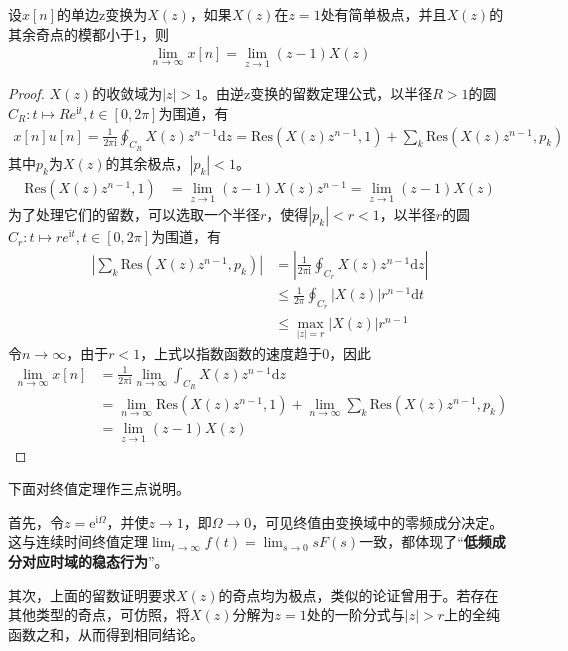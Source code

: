 \begin{theorem}[单边z变换的终值定理]
    设$x[n]$的单边z变换为$X(z)$，如果$X(z)$在$z=1$处有简单极点，并且$X(z)$的其余奇点的模都小于1，则\begin{align*}
    \lim_{n\to\infty}x[n]=\lim_{z\to 1}(z-1)X(z)
    \end{align*}
\end{theorem}
\begin{proof}
    $X(z)$的收敛域为$|z|>1$。由逆z变换的留数定理公式，以半径$R>1$的圆$C_R:t\mapsto Re^{\mathrm{i}t},t\in[0,2\pi]$为围道，有\begin{align*}
    x[n]u[n]=\frac{1}{2\pi\mathrm{i}}\oint_{C_R}X(z)z^{n-1}\mathrm{d}z=\mathrm{Res}(X(z)z^{n-1},1)+\sum_{k}\mathrm{Res}(X(z)z^{n-1},p_k)
    \end{align*}
    其中$p_k$为$X(z)$的其余极点，$|p_k|<1$。
    \begin{align*}
        \mathrm{Res}(X(z)z^{n-1},1)&=\lim_{z\to 1}(z-1)X(z)z^{n-1}=\lim_{z\to 1}(z-1)X(z)
    \end{align*}
    为了处理它们的留数，可以选取一个半径$r$，使得$|p_k|<r<1$，以半径$r$的圆$C_{r}:t\mapsto re^{\mathrm{i}t},t\in[0,2\pi]$为围道，有\begin{align*}
    \left|\sum_{k}\mathrm{Res}(X(z)z^{n-1},p_k)\right|&=\left|\frac{1}{2\pi\mathrm{i}}\oint_{C_r}X(z)z^{n-1}\mathrm{d}z\right|\\
    &\leq \frac{1}{2\pi}\oint_{C_r}|X(z)|r^{n-1}\mathrm{d}t\\
    &\leq \max_{|z|=r}|X(z)|r^{n-1}
    \end{align*}
    令$n\to\infty$，由于$r<1$，上式以指数函数的速度趋于$0$，因此\begin{align*}
    \lim_{n\to\infty}x[n]&=\frac{1}{2\pi\mathrm{i}}\lim_{n\to\infty}\int_{C_R}X(z)z^{n-1}\mathrm{d}z\\
    &=\lim_{n\to\infty}\mathrm{Res}(X(z)z^{n-1},1)+\lim_{n\to\infty}\sum_{k}\mathrm{Res}(X(z)z^{n-1},p_k)\\
    &=\lim_{z\to 1}(z-1)X(z)
    \end{align*}
\end{proof}

下面对终值定理作三点说明。

首先，令$z=\mathrm{e}^{\mathrm{i}\Omega}$，并使$z\to 1$，即$\Omega\to 0$，可见终值由变换域中的零频成分决定。这与连续时间终值定理$\lim_{t\to\infty}f(t)=\lim_{s\to 0}sF(s)$一致，都体现了“\textbf{低频成分对应时域的稳态行为}”。

其次，上面的留数证明要求$X(z)$的奇点均为极点，类似的论证曾用于。若存在其他类型的奇点，可仿照，将$X(z)$分解为$z=1$处的一阶分式与$|z|>r$上的全纯函数之和，从而得到相同结论。

